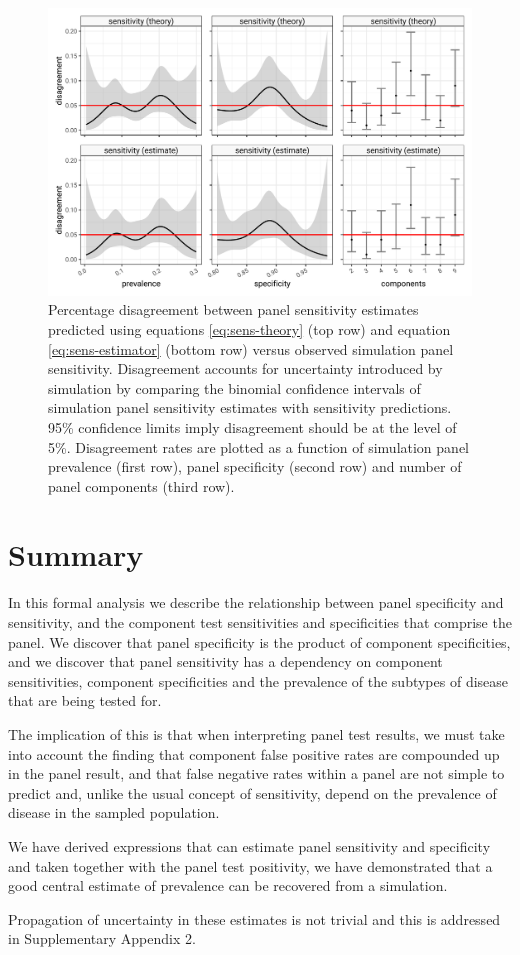 \documentclass[a4paper, 12pt, twoside]{article}
\let\Oldsection\section
\renewcommand{\section}{\FloatBarrier\Oldsection}
\begin{document}
\begin{figure}[h!]
\centering
  \includegraphics{fig/calibration-prediction-v-simulation.png}
  \caption{Percentage disagreement between panel sensitivity estimates predicted using equations \eqref{eq:sens-theory} (top row) and equation \eqref{eq:sens-estimator} (bottom row) versus observed simulation panel sensitivity. Disagreement accounts for uncertainty introduced by simulation by comparing the binomial confidence intervals of simulation panel sensitivity estimates with sensitivity predictions. 95\% confidence limits imply disagreement should be at the level of 5\%. Disagreement rates are plotted as a function of simulation panel prevalence (first row), panel specificity (second row) and number of panel components (third row).}
\label{fig:A6}
\end{figure}

\section{Summary}

In this formal analysis we describe the relationship between panel specificity and sensitivity, and the component test sensitivities and specificities that comprise the panel. We discover that panel specificity is the product of component specificities, and we discover that panel sensitivity has a dependency on component sensitivities, component specificities and the prevalence of the subtypes of disease that are being tested for.

The implication of this is that when interpreting panel test results, we must take into account the finding that component false positive rates are compounded up in the panel result, and that false negative rates within a panel are not simple to predict and, unlike the usual concept of sensitivity, depend on the prevalence of disease in the sampled population.

We have derived expressions that can estimate panel sensitivity and specificity and taken together with the panel test positivity, we have demonstrated that a good central estimate of prevalence can be recovered from a simulation.

Propagation of uncertainty in these estimates is not trivial and this is addressed in Supplementary Appendix 2.


\end{document}
